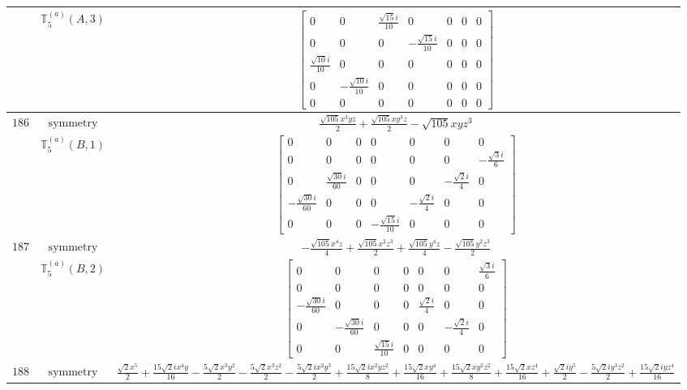 \documentclass[fleqn,8pt,landscape]{jsarticle}
\begin{document}
\begin{longtable}{ccc}
$  $ & $ \mathbb{T}_{5}^{(a)}(A,3) $ & $ \begin{bmatrix} 0 & 0 & \frac{\sqrt{15} i}{10} & 0 & 0 & 0 & 0 \\ 0 & 0 & 0 & - \frac{\sqrt{15} i}{10} & 0 & 0 & 0 \\ \frac{\sqrt{10} i}{10} & 0 & 0 & 0 & 0 & 0 & 0 \\ 0 & - \frac{\sqrt{10} i}{10} & 0 & 0 & 0 & 0 & 0 \\ 0 & 0 & 0 & 0 & 0 & 0 & 0 \end{bmatrix} $ \\ \hline
$ 186 $ & $ \text{symmetry} $ & $ \frac{\sqrt{105} x^{3} y z}{2} + \frac{\sqrt{105} x y^{3} z}{2} - \sqrt{105} x y z^{3} $ \\
$  $ & $ \mathbb{T}_{5}^{(a)}(B,1) $ & $ \begin{bmatrix} 0 & 0 & 0 & 0 & 0 & 0 & 0 \\ 0 & 0 & 0 & 0 & 0 & 0 & - \frac{\sqrt{3} i}{6} \\ 0 & \frac{\sqrt{30} i}{60} & 0 & 0 & 0 & - \frac{\sqrt{2} i}{4} & 0 \\ - \frac{\sqrt{30} i}{60} & 0 & 0 & 0 & - \frac{\sqrt{2} i}{4} & 0 & 0 \\ 0 & 0 & 0 & - \frac{\sqrt{15} i}{10} & 0 & 0 & 0 \end{bmatrix} $ \\ \hline
$ 187 $ & $ \text{symmetry} $ & $ - \frac{\sqrt{105} x^{4} z}{4} + \frac{\sqrt{105} x^{2} z^{3}}{2} + \frac{\sqrt{105} y^{4} z}{4} - \frac{\sqrt{105} y^{2} z^{3}}{2} $ \\
$  $ & $ \mathbb{T}_{5}^{(a)}(B,2) $ & $ \begin{bmatrix} 0 & 0 & 0 & 0 & 0 & 0 & \frac{\sqrt{3} i}{6} \\ 0 & 0 & 0 & 0 & 0 & 0 & 0 \\ - \frac{\sqrt{30} i}{60} & 0 & 0 & 0 & \frac{\sqrt{2} i}{4} & 0 & 0 \\ 0 & - \frac{\sqrt{30} i}{60} & 0 & 0 & 0 & - \frac{\sqrt{2} i}{4} & 0 \\ 0 & 0 & \frac{\sqrt{15} i}{10} & 0 & 0 & 0 & 0 \end{bmatrix} $ \\ \hline
$ 188 $ & $ \text{symmetry} $ & $ \frac{\sqrt{2} x^{5}}{2} + \frac{15 \sqrt{2} i x^{4} y}{16} - \frac{5 \sqrt{2} x^{3} y^{2}}{2} - \frac{5 \sqrt{2} x^{3} z^{2}}{2} - \frac{5 \sqrt{2} i x^{2} y^{3}}{2} + \frac{15 \sqrt{2} i x^{2} y z^{2}}{8} + \frac{15 \sqrt{2} x y^{4}}{16} + \frac{15 \sqrt{2} x y^{2} z^{2}}{8} + \frac{15 \sqrt{2} x z^{4}}{16} + \frac{\sqrt{2} i y^{5}}{2} - \frac{5 \sqrt{2} i y^{3} z^{2}}{2} + \frac{15 \sqrt{2} i y z^{4}}{16} $ \\

\end{longtable}
\end{document}
